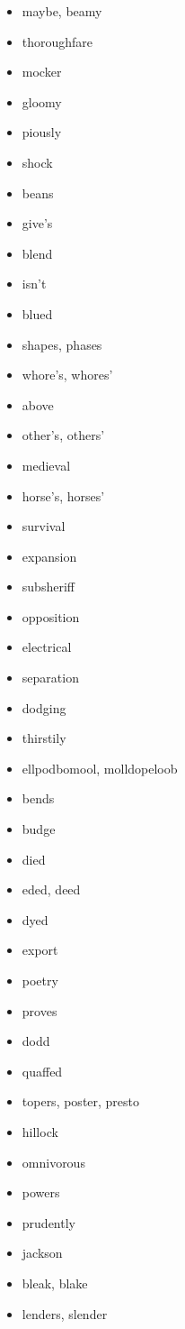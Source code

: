 \documentclass{article}
\begin{document}
\begin{itemize}
    \item maybe, beamy
    \item thoroughfare
    \item mocker
    \item gloomy
    \item piously
    \item shock
    \item beans
    \item give's
    \item blend
    \item isn't
    \item blued
    \item shapes, phases
    \item whore's, whores'
    \item above
    \item other's, others'
    \item medieval
    \item horse's, horses'
    \item survival
    \item expansion
    \item subsheriff
    \item opposition
    \item electrical
    \item separation
    \item dodging
    \item thirstily
    \item ellpodbomool, molldopeloob
    \item bends
    \item budge
    \item died
    \item eded, deed
    \item dyed
    \item export
    \item poetry
    \item proves
    \item dodd
    \item quaffed
    \item topers, poster, presto
    \item hillock
    \item omnivorous
    \item powers
    \item prudently
    \item jackson
    \item bleak, blake
    \item lenders, slender

\end{itemize}
\end{document}
